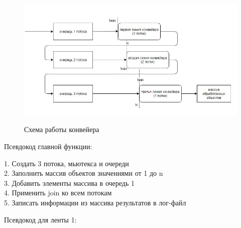 \documentclass[a4paper,12pt]{article}
\begin{document}
\begin{figure}[h!]
	\begin{center}
		{\includegraphics[width=\textwidth]{conv.jpg}}
		\caption{
			Схема работы конвейера}
		\label{fig:insert}
	\end{center}
\end{figure}

Псевдокод главной функции:

\begin{flushleft}
	1. Создать 3 потока, мьютекса и очереди\\
	2. Заполнить массив объектов значениями от 1 до n\\
	3. Добавить элементы массива в очередь 1\\
	4. Применить join ко всем потокам\\
	5. Записать информации из массива результатов в лог-файл\\
\end{flushleft}

Псевдокод для ленты 1:
\end{document}
